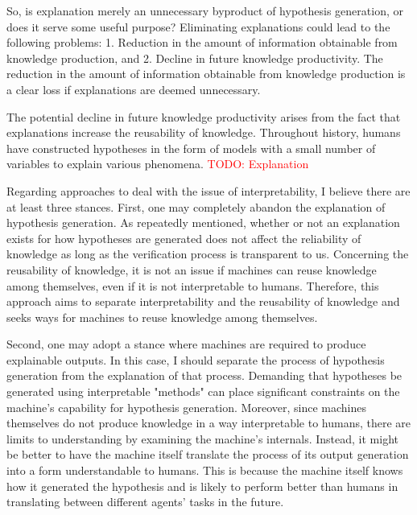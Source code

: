 So, is explanation merely an unnecessary byproduct of hypothesis generation, or does it serve some useful purpose? Eliminating explanations could lead to the following problems: 1. Reduction in the amount of information obtainable from knowledge production, and 2. Decline in future knowledge productivity. The reduction in the amount of information obtainable from knowledge production is a clear loss if explanations are deemed unnecessary.

The potential decline in future knowledge productivity arises from the fact that explanations increase the reusability of knowledge. Throughout history, humans have constructed hypotheses in the form of models with a small number of variables to explain various phenomena. 
\textcolor{red}{TODO: Explanation}

Regarding approaches to deal with the issue of interpretability, I believe there are at least three stances. First, one may completely abandon the explanation of hypothesis generation. As repeatedly mentioned, whether or not an explanation exists for how hypotheses are generated does not affect the reliability of knowledge as long as the verification process is transparent to us. Concerning the reusability of knowledge, it is not an issue if machines can reuse knowledge among themselves, even if it is not interpretable to humans. Therefore, this approach aims to separate interpretability and the reusability of knowledge and seeks ways for machines to reuse knowledge among themselves.

Second, one may adopt a stance where machines are required to produce explainable outputs. In this case, I should separate the process of hypothesis generation from the explanation of that process. Demanding that hypotheses be generated using interpretable "methods" can place significant constraints on the machine's capability for hypothesis generation. Moreover, since machines themselves do not produce knowledge in a way interpretable to humans, there are limits to understanding by examining the machine's internals. Instead, it might be better to have the machine itself translate the process of its output generation into a form understandable to humans. This is because the machine itself knows how it generated the hypothesis and is likely to perform better than humans in translating between different agents' tasks in the future.


